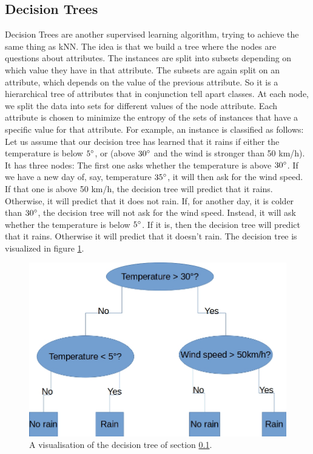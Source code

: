 \documentclass[10pt,a4paper]{article}
\begin{document}
\subsection{Decision Trees}
\label{decision_trees}
Decision Trees are another supervised learning algorithm, trying to achieve the same thing as kNN. The idea is that we build a tree where the nodes are questions about attributes. The instances are split into subsets depending on which value they have in that attribute. The subsets are again split on an attribute, which depends on the value of the previous attribute. So it is a hierarchical tree of attributes that in conjunction tell apart classes. At each node, we split the data into sets for different values of the node attribute. Each attribute is chosen to minimize the entropy of the sets of instances that have a specific value for that attribute. For example, an instance is classified as follows: 
Let us assume that our decision tree has learned that it rains if either the temperature is below $5 \degree$, or (above $30 \degree$ and the wind is stronger than 50 km/h). It has three nodes: The first one asks whether the temperature is above $30 \degree$. If we have a new day of, say, temperature $35 \degree$, it will then ask for the wind speed. If that one is above 50 km/h, the decision tree will predict that it rains. Otherwise, it will predict that it does not rain. If, for another day, it is colder than $30 \degree$, the decision tree will not ask for the wind speed. Instead, it will ask whether the temperature is below $5 \degree$. If it is, then the decision tree will predict that it rains. Otherwise it will predict that it doesn't rain. The decision tree is visualized in figure \ref{fig:weather-decision-tree}.

\begin{figure}[htbp]
    \centering
    \includegraphics[scale=0.7]{Decision_Tree_Example.jpg}
    \caption{A visualisation of the decision tree of section \ref{decision_trees}.}
    \label{fig:weather-decision-tree}
\end{figure}
\end{document}
